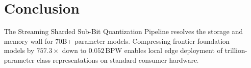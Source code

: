 \documentclass[11pt,a4paper]{article}
\begin{document}
\section{Conclusion}
The Streaming Sharded Sub-Bit Quantization Pipeline resolves the storage and memory wall for 70B+ parameter models. Compressing frontier foundation models by $757.3\times$ down to $0.052$\,BPW enables local edge deployment of trillion-parameter class representations on standard consumer hardware.
\end{document}
